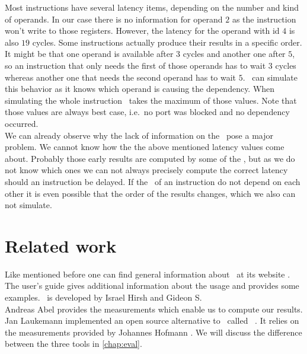 Most instructions have several latency items, depending on the number and kind of operands. In our case there is no information for operand $2$ as the instruction won't write to those registers. However, the latency for the operand with id $4$ is also $19$ cycles. Some instructions actually produce their results in a specific order. It might be that one operand is available after $3$ cycles and another one after $5$, so an instruction that only needs the first of those operands has to wait $3$ cycles whereas another one that needs the second operand has to wait $5$. \suaca\ can simulate this behavior as it knows which operand is causing the dependency. When simulating the whole instruction \suaca\ takes the maximum of those values. Note that those values are always best case, i.e.\ no port was blocked and no dependency occurred.\\
We can already observe why the lack of information on the \microops\ pose a major problem. We cannot know how the the above mentioned latency values come about. Probably those early results are computed by some of the \microops, but as we do not know which ones we can not always precisely compute the correct latency should an instruction be delayed. If the \microops\ of an instruction do not depend on each other it is even possible that the order of the results changes, which we also can not simulate.

\section{Related work}

Like mentioned before one can find general information about \iaca\ at its website \cite{iaca}. The user's guide \cite{userguide} gives additional information about the usage and provides some examples. \iaca\ is developed by Israel Hirsh and Gideon S.\\

Andreas Abel \cite{Andreas} provides the measurements which enable us to compute our results.\\

Jan Laukemann \cite{osaca-thesis} implemented an open source alternative to \iaca\ called \osaca\ \cite{osaca-web}. It relies on the measurements provided by Johannes Hofmann \cite{ibench}. We will discuss the difference between the three tools in \autoref{chap:eval}.
